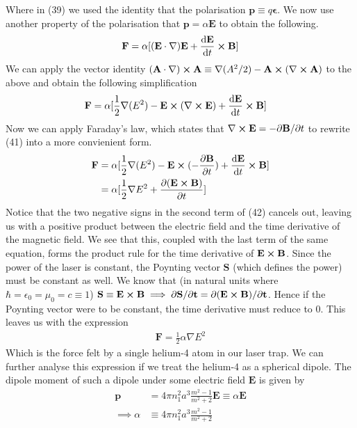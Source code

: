 \documentclass{article}
\newcommand{\ve}{\mathbf}
\newcommand{\pa}{\partial}
\begin{document}
Where in (39) we used the identity that the polarisation $\ve{p}\equiv q\boldsymbol{\epsilon}$.  We now use 
another property of the polarisation that $\ve{p}=\alpha\ve{E}$ to obtain the following. 
\begin{align}
    \ve{F}=\alpha[(\ve{E}\cdot\nabla)\ve{E}+\dv{\ve{E}}{t}\cross\ve{B}]
\end{align}
We can apply the vector identity $(\ve{A}\cdot\nabla)\cross\ve{A}\equiv\nabla(A^2/2)-\ve{A}\cross(\nabla\cross\ve{A})$ to the above and 
obtain the following simplification
\begin{align}
    \ve{F}&= \alpha[\frac{1}{2}\nabla(E^2)-\ve{E}\cross(\nabla\cross\ve{E})+\dv{\ve{E}}{t}\cross\ve{B}]
\end{align}
Now we can apply Faraday's law, which states that $\nabla\cross\ve{E}=-\pa\ve{B}/\pa t$ to rewrite (41) into a more convienient form.
\begin{align}
    \ve{F}&=\alpha[\frac{1}{2}\nabla(E^2)-\ve{E}\cross(-\pdv{\ve{B}}{t})+\dv{\ve{E}}{t}\cross\ve{B}]\\ 
    &= \alpha[\frac{1}{2}\nabla E^2+\pdv{(\ve{E}\cross \ve{B})}{t}]
\end{align}
Notice that the two negative signs in the second term of (42) cancels out, leaving us with a positive product between the electric field and 
the time derivative of the magnetic field. We see that this, coupled with the last term of the same equation, forms the product rule for the time derivative of 
$\ve{E}\cross\ve{B}$. Since the power of the laser is constant, the Poynting vector $\ve{S}$ (which defines the power) must be 
constant as well. We know that (in natural units where $\hbar=\epsilon_0=\mu_0=c\equiv1$) $\ve{S}\equiv\ve{E}\cross\ve{B}\implies \pa\ve{S}/\pa\ve{t}=\pa(\ve{E}\cross\ve{B})/\pa\ve{t}$.
Hence if the Poynting vector were to be constant, 
the time derivative must reduce to 0. This leaves us with the expression 
\begin{align}
    \ve{F}=\frac{1}{2}\alpha\nabla E^2
\end{align}
Which is the force felt by a single helium-4 atom in our laser trap. We can further analyse this expression 
if we treat the helium-4 as a spherical dipole. The dipole moment of such a dipole under some electric field $\ve{E}$ is given by 
\begin{align}
    \ve{p}&=4\pi n_1^2a^3\frac{m^2-1}{m^2+2}\ve{E}\equiv\alpha\ve{E}\\ 
    \implies\alpha&\equiv4\pi n_1^2a^3\frac{m^2-1}{m^2+2}
\end{align}
\end{document}
